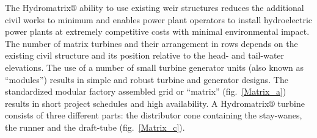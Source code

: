 The Hydromatrix$\circledR$ ability to use existing weir structures reduces the  additional civil works to minimum and enables power plant operators to install hydroelectric power plants at extremely competitive costs with minimal environmental impact. The number of matrix turbines and their arrangement in rows depends on the existing civil structure and its position relative to the head- and tail-water elevations. The use of a number of small turbine generator units (also known as “modules”) results in simple and robust turbine and generator designs. The standardized modular factory assembled grid or “matrix” (fig.\ \ref{Matrix_a}) results in short project schedules and high availability. A Hydromatrix$\circledR$ turbine consists of three different parts: the distributor cone containing the stay-wanes, the runner and the draft-tube (fig.\ \ref{Matrix_c}).



